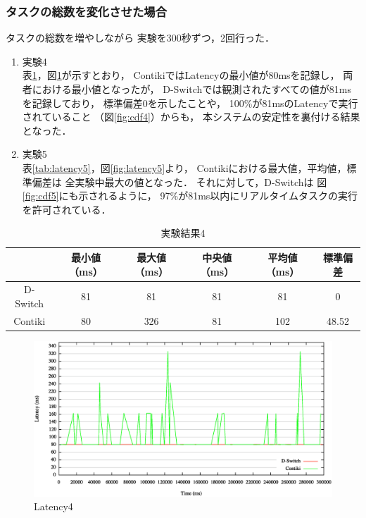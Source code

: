\subsubsection{タスクの総数を変化させた場合}

\vspace{0.5em}タスクの総数を増やしながら
実験を300秒ずつ，2回行った．

\begin{enumerate}
\item{実験4}\\
表\ref{tab:latency4}，図\ref{fig:latency4}が示すとおり，
ContikiではLatencyの最小値が80msを記録し，
両者における最小値となったが，
D-Switchでは観測されたすべての値が81msを記録しており，
標準偏差0を示したことや，
100\%が81msのLatencyで実行されていること
（図\ref{fig:cdf4}）からも，
本システムの安定性を裏付ける結果となった．
\newline
\item{実験5}\\
表\ref{tab:latency5}，図\ref{fig:latency5}より，
Contikiにおける最大値，平均値，標準偏差は
全実験中最大の値となった．
それに対して，D-Switchは
図\ref{fig:cdf5}にも示されるように，
97\%が81ms以内にリアルタイムタスクの実行を許可されている．
\end{enumerate}



\begin{table}[htbp]
  \centering
  \caption{実験結果4}
  \begin{tabular}{|c||c|c|c|c|c|} \hline
    \backslashbox{}{} & 最小値（ms） & 最大値（ms） & 中央値（ms） & 平均値（ms） & 標準偏差 \\ \hline \hline
    D-Switch & 81 & 81 & 81 & 81 & 0 \\ \hline
    Contiki & 80 & 326 & 81 & 102 & 48.52 \\ \hline
  \end{tabular}
  \label{tab:latency4}
\end{table}

\begin{figure}[htbp]
 \begin{center}
  \includegraphics[width=120mm]{./images/latency4.eps}
 \end{center}
 \caption{Latency4}
 \label{fig:latency4}
\end{figure}

